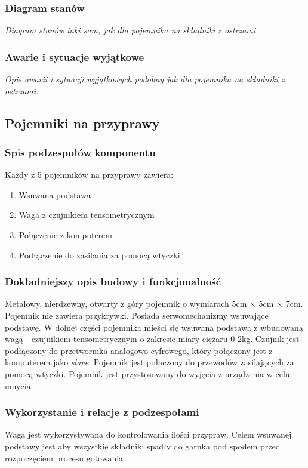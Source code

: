 \documentclass[12pt,a4paper,notitlepage]{article}
\begin{document}
\subsubsection{Diagram stanów}
\emph{Diagram stanów taki sam, jak dla pojemnika na składniki z ostrzami.}

\subsubsection{Awarie i sytuacje wyjątkowe}
\emph{Opis awarii i sytuacji wyjątkowych podobny jak dla pojemnika na składniki z ostrzami.}



\subsection{Pojemniki na przyprawy}
\subsubsection{Spis podzespołów komponentu}
Każdy z 5 pojemników na przyprawy zawiera:
\begin{enumerate}
  \item Wsuwana podstawa
  \item Waga z czujnikiem tensometrycznym
  \item Połączenie z komputerem
  \item Podłączenie do zasilania za pomocą wtyczki
\end{enumerate}

\subsubsection{Dokładniejszy opis budowy i funkcjonalność}
Metalowy, nierdzewny, otwarty z góry pojemnik o wymiarach 5cm $\times$ 5cm $\times$ 7cm. Pojemnik nie zawiera przykrywki. Posiada serwomechanizmy wsuwające podstawę. W dolnej części pojemnika mieści się wsuwana podstawa z wbudowaną wagą - czujnikiem tensometrycznym o zakresie miary ciężaru 0-2kg. Czujnik jest podłączony do przetwornika analogowo-cyfrowego, który połączony jest z komputerem jako \emph{slave}. Pojemnik jest połączony do przewodów zasilających za pomocą wtyczki. Pojemnik jest przystosowany do wyjęcia z urządzenia w celu umycia.
 
\subsubsection{Wykorzystanie i relacje z podzespołami}
Waga jest wykorzystywana do kontrolowania ilości przypraw. Celem wsuwanej podstawy jest aby wszystkie składniki spadły do garnka pod spodem przed rozpoczęciem procesu gotowania.
\end{document}
